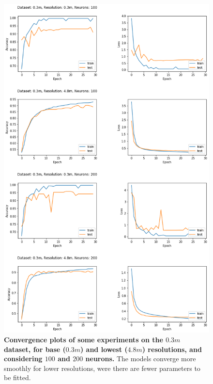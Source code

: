 \begin{figure}[h!]
	\centering
	\includegraphics[width=\textwidth]{Figures/results/convergence_plots_03m.png}
	\captionsetup{width=1\linewidth}
	\caption{\textbf{Convergence plots of some experiments on the $0.3m$ dataset, for base ($0.3m$) and lowest ($4.8m$) resolutions, and considering $100$ and $200$ neurons.} The models converge more smoothly for lower resolutions, were there are fewer parameters to be fitted.}
	\label{fig:conv_plots_03m}
\end{figure}

